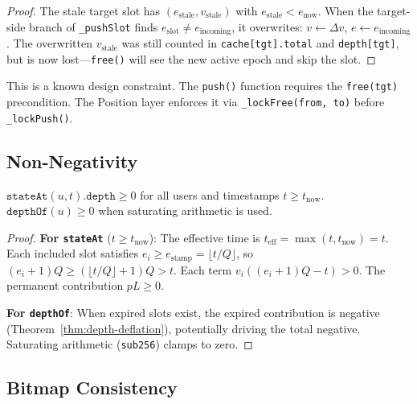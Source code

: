 \documentclass[10pt,a4paper,twocolumn]{article}
\begin{document}
\begin{proof}
The stale target slot has $(e_{\text{stale}}, v_{\text{stale}})$ with $e_{\text{stale}} < e_{\text{now}}$. When the target-side branch of \texttt{\_pushSlot} finds $e_{\text{slot}} \neq e_{\text{incoming}}$, it overwrites: $v \leftarrow \Delta v$, $e \leftarrow e_{\text{incoming}}$. The overwritten $v_{\text{stale}}$ was still counted in \texttt{cache[tgt].total} and \texttt{depth[tgt]}, but is now lost---\texttt{free()} will see the new active epoch and skip the slot.
\end{proof}

\begin{remark}
This is a known design constraint. The \texttt{push()} function requires the \texttt{free(tgt)} precondition. The Position layer enforces it via \texttt{\_lockFree(from, to)} before \texttt{\_lockPush()}.
\end{remark}

\subsection{Non-Negativity}

\begin{theorem}
\label{thm:non-negativity}
$\texttt{stateAt}(u, t).\texttt{depth} \geq 0$ for all users and timestamps $t \geq t_{\text{now}}$. $\texttt{depthOf}(u) \geq 0$ when saturating arithmetic is used.
\end{theorem}

\begin{proof}
\textbf{For \texttt{stateAt}} ($t \geq t_{\text{now}}$): The effective time is $t_{\text{eff}} = \max(t, t_{\text{now}}) = t$. Each included slot satisfies $e_i \geq e_{\text{stamp}} = \lfloor t/Q \rfloor$, so $(e_i{+}1)Q \geq (\lfloor t/Q \rfloor {+} 1)Q > t$. Each term $v_i((e_i{+}1)Q - t) > 0$. The permanent contribution $pL \geq 0$.

\textbf{For \texttt{depthOf}}: When expired slots exist, the expired contribution is negative (Theorem~\ref{thm:depth-deflation}), potentially driving the total negative. Saturating arithmetic (\texttt{sub256}) clamps to zero.
\end{proof}

\subsection{Bitmap Consistency}
\end{document}
